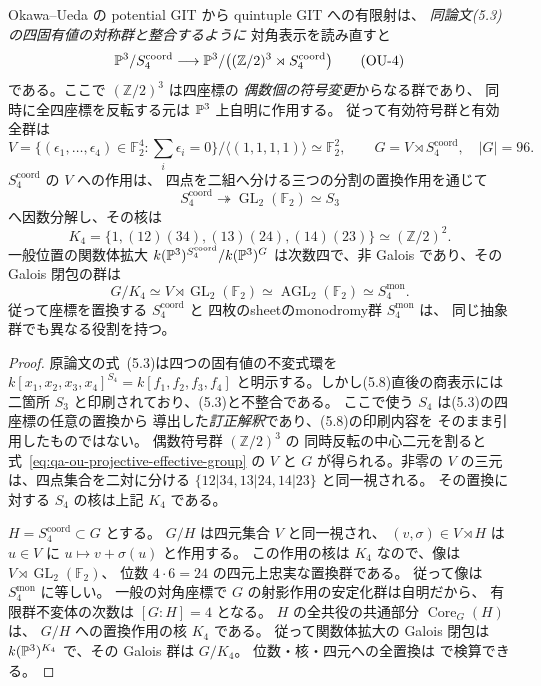 \begin{proposition}
\label{prop:qa-ou-fourfold-s4-monodromy}
Okawa--Ueda \cite[\S5, (5.3), (5.8)]{OU2014} の
potential GIT から quintuple GIT への有限射は、
\emph{同論文(5.3)の四固有値の対称群と整合するように}
対角表示を読み直すと
\[
 \mathbb P^3/S_4^{\mathrm{coord}}
 \longrightarrow
 \mathbb P^3/\bigl((\mathbb Z/2)^3\rtimes
                    S_4^{\mathrm{coord}}\bigr)
 \tag{OU-4}\label{eq:qa-ou-fourfold-diagonal}
\]
である。ここで $(\mathbb Z/2)^3$ は四座標の
\emph{偶数個の符号変更}からなる群であり、
同時に全四座標を反転する元は $\mathbb P^3$ 上自明に作用する。
従って有効符号群と有効全群は
\[
 V=\bigl\{(\epsilon_1,\ldots,\epsilon_4)\in\mathbb F_2^4:
             \textstyle\sum_i\epsilon_i=0\bigr\}
        /\langle(1,1,1,1)\rangle
   \simeq\mathbb F_2^2,\qquad
 G=V\rtimes S_4^{\mathrm{coord}},\quad |G|=96.
 \tag{OU-G}\label{eq:qa-ou-projective-effective-group}
\]
$S_4^{\mathrm{coord}}$ の $V$ への作用は、
四点を二組へ分ける三つの分割の置換作用を通じて
\[
 S_4^{\mathrm{coord}}\twoheadrightarrow
 \operatorname{GL}_2(\mathbb F_2)\simeq S_3
\]
へ因数分解し、その核は
\[
 K_4=\{1,(12)(34),(13)(24),(14)(23)\}\simeq(\mathbb Z/2)^2.
\]
一般位置の関数体拡大
$k(\mathbb P^3)^{S_4^{\mathrm{coord}}}/k(\mathbb P^3)^G$
は次数四で、非 Galois であり、その Galois 閉包の群は
\[
 G/K_4\simeq V\rtimes\operatorname{GL}_2(\mathbb F_2)
 \simeq\operatorname{AGL}_2(\mathbb F_2)
 \simeq S_4^{\mathrm{mon}}.
 \tag{OU-mon}\label{eq:qa-ou-galois-closure-s4}
\]
従って座標を置換する $S_4^{\mathrm{coord}}$ と
四枚のsheetのmonodromy群 $S_4^{\mathrm{mon}}$ は、
同じ抽象群でも異なる役割を持つ。
\end{proposition}
\begin{proof}
原論文の式~(5.3)は四つの固有値の不変式環を
$k[x_1,x_2,x_3,x_4]^{S_4}=k[f_1,f_2,f_3,f_4]$
と明示する。しかし(5.8)直後の商表示には
二箇所 $S_3$ と印刷されており、(5.3)と不整合である。
ここで使う $S_4$ は(5.3)の四座標の任意の置換から
導出した\emph{訂正解釈}であり、(5.8)の印刷内容を
そのまま引用したものではない。
偶数符号群 $(\mathbb Z/2)^3$ の
同時反転の中心二元を割ると
式~\eqref{eq:qa-ou-projective-effective-group} の $V$ と
$G$ が得られる。非零の $V$ の三元は、四点集合を二対に分ける
$\{12|34,13|24,14|23\}$ と同一視される。
その置換に対する $S_4$ の核は上記 $K_4$ である。

$H=S_4^{\mathrm{coord}}\subset G$ とする。
$G/H$ は四元集合 $V$ と同一視され、
$(v,\sigma)\in V\rtimes H$ は $u\in V$ に
$u\mapsto v+\sigma(u)$ と作用する。
この作用の核は $K_4$ なので、像は
$V\rtimes\operatorname{GL}_2(\mathbb F_2)$、
位数 $4\cdot6=24$ の四元上忠実な置換群である。
従って像は $S_4^{\mathrm{mon}}$ に等しい。
一般の対角座標で $G$ の射影作用の安定化群は自明だから、
有限群不変体の次数は $[G:H]=4$ となる。
$H$ の全共役の共通部分 $\operatorname{Core}_G(H)$ は、
$G/H$ への置換作用の核 $K_4$ である。
従って関数体拡大の Galois 閉包は
$k(\mathbb P^3)^{K_4}$ で、その Galois 群は $G/K_4$。
位数・核・四元への全置換は
 で検算できる。
\end{proof}

